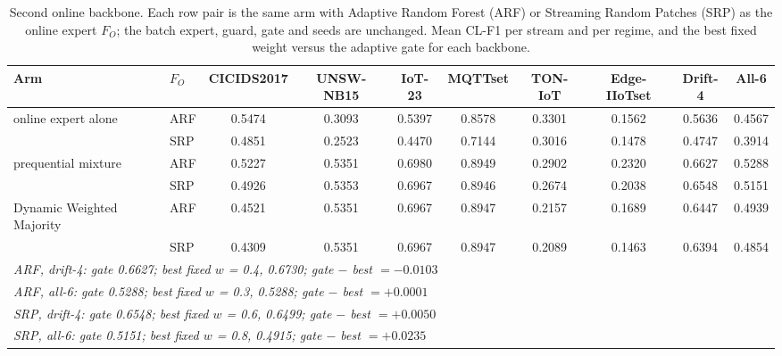 \begin{table}[t]
\centering
\caption{Second online backbone. Each row pair is the same arm with Adaptive Random Forest (ARF) or Streaming Random Patches (SRP) as the online expert $F_O$; the batch expert, guard, gate and seeds are unchanged. Mean CL-F1 per stream and per regime, and the best fixed weight versus the adaptive gate for each backbone.}
\label{tab:hybrid_srp}
\footnotesize
\setlength{\tabcolsep}{3.5pt}
\begin{tabular}{llcccccccc}
\toprule
Arm & $F_O$ & CICIDS2017 & UNSW-NB15 & IoT-23 & MQTTset & TON-IoT & Edge-IIoTset & Drift-4 & All-6 \\
\midrule
online expert alone & ARF & 0.5474 & 0.3093 & 0.5397 & 0.8578 & 0.3301 & 0.1562 & 0.5636 & 0.4567 \\
 & SRP & 0.4851 & 0.2523 & 0.4470 & 0.7144 & 0.3016 & 0.1478 & 0.4747 & 0.3914 \\
\midrule
prequential mixture & ARF & 0.5227 & 0.5351 & 0.6980 & 0.8949 & 0.2902 & 0.2320 & 0.6627 & 0.5288 \\
 & SRP & 0.4926 & 0.5353 & 0.6967 & 0.8946 & 0.2674 & 0.2038 & 0.6548 & 0.5151 \\
\midrule
Dynamic Weighted Majority & ARF & 0.4521 & 0.5351 & 0.6967 & 0.8947 & 0.2157 & 0.1689 & 0.6447 & 0.4939 \\
 & SRP & 0.4309 & 0.5351 & 0.6967 & 0.8947 & 0.2089 & 0.1463 & 0.6394 & 0.4854 \\
\midrule
\multicolumn{10}{l}{\emph{ARF, drift-4: gate 0.6627; best fixed $w$ = 0.4, 0.6730; gate $-$ best $= -0.0103$}} \\
\multicolumn{10}{l}{\emph{ARF, all-6: gate 0.5288; best fixed $w$ = 0.3, 0.5288; gate $-$ best $= +0.0001$}} \\
\multicolumn{10}{l}{\emph{SRP, drift-4: gate 0.6548; best fixed $w$ = 0.6, 0.6499; gate $-$ best $= +0.0050$}} \\
\multicolumn{10}{l}{\emph{SRP, all-6: gate 0.5151; best fixed $w$ = 0.8, 0.4915; gate $-$ best $= +0.0235$}} \\
\bottomrule
\end{tabular}
\end{table}